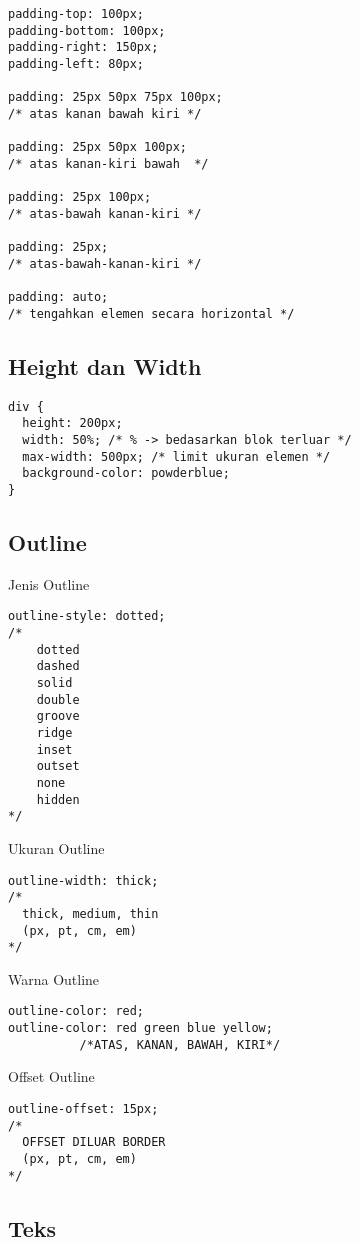 \documentclass[12pt,a4paper]{article}
\begin{document}
\begin{lstlisting}
padding-top: 100px;
padding-bottom: 100px;
padding-right: 150px;
padding-left: 80px;

padding: 25px 50px 75px 100px;
/* atas kanan bawah kiri */

padding: 25px 50px 100px;
/* atas kanan-kiri bawah  */

padding: 25px 100px;
/* atas-bawah kanan-kiri */

padding: 25px;
/* atas-bawah-kanan-kiri */

padding: auto;
/* tengahkan elemen secara horizontal */
\end{lstlisting}

\subsection*{Height dan Width}

\begin{lstlisting}
div {
  height: 200px;
  width: 50%; /* % -> bedasarkan blok terluar */
  max-width: 500px; /* limit ukuran elemen */
  background-color: powderblue;
}
\end{lstlisting}

\subsection*{Outline}

Jenis Outline
\begin{lstlisting}
outline-style: dotted;
/*
    dotted
    dashed
    solid 
    double
    groove
    ridge 
    inset 
    outset
    none
    hidden
*/
\end{lstlisting}

Ukuran Outline
\begin{lstlisting}
outline-width: thick;
/*
  thick, medium, thin
  (px, pt, cm, em)
*/
\end{lstlisting}

Warna Outline
\begin{lstlisting}
outline-color: red; 
outline-color: red green blue yellow;
          /*ATAS, KANAN, BAWAH, KIRI*/
\end{lstlisting}


Offset Outline
\begin{lstlisting}
outline-offset: 15px;
/*
  OFFSET DILUAR BORDER
  (px, pt, cm, em)
*/
\end{lstlisting}

\subsection*{Teks}
\end{document}
